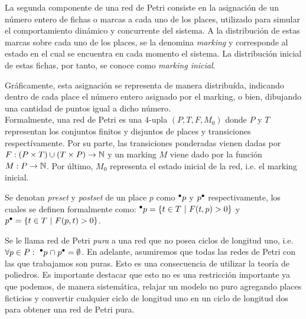 La segunda componente de una red de Petri consiste en la asignación
de un número entero de fichas o marcas a cada uno de los places, 
utilizado para simular el comportamiento dinámico y concurrente del sistema.
A la distribución de estas marcas sobre cada uno de los places, se la denomina
\textit{marking} y corresponde al estado en el cual se encuentra en cada momento el sistema.
La distribución inicial de estas fichas, por tanto, se conoce como \textit{marking inicial}.

Gráficamente, esta asignación se representa de manera distribuída, indicando dentro 
de cada place el número entero asignado por el marking, o bien, dibujando una 
cantidad de puntos igual a dicho número.
\\

Formalmente, una red de Petri es una 4-upla $(P,T,F,M_0)$ donde $P$ y $T$\footnotemark[1]
representan los conjuntos finitos y disjuntos de places y transiciones respectívamente.
Por su parte, las transiciones ponderadas vienen dadas por \mbox{$F:(P \times T) \cup (T \times P)  \to \mathbb{N}$}
y un marking $M$ viene dado por la función \mbox{$M:P \to \mathbb{N}$}.
Por último, $M_0$ representa el estado inicial de la red, i.e. el marking inicial.


Se denotan \textit{preset} y \textit{postset} de un place $p$ como $\mbox{$^\bullet p$}$ y $\mbox{$p^\bullet$}$ respectivamente,
los cuales se definen formalmente como: $\mbox{$^\bullet p$} =  \{t \in T ~|~ F(t,p) > 0 \}$
y $\mbox{$p^\bullet$} = \{t \in T ~|~ F(p,t) > 0 \}$.

Se le llama red de Petri \emph{pura} a una red que no posea ciclos de longitud uno, i.e.
$\forall p \in P:~ {\mbox{$^\bullet p$}} \mathrel{\cap} {\mbox{$p^\bullet$}} = \emptyset$.
En adelante, asumiremos que todas las redes de Petri con las que trabajamos son puras.
Esto es una consecuencia de utilizar la teoría de poliedros. Es importante destacar que esto no es una 
restricción importante ya que podemos, de manera sistemática, relajar un modelo no puro agregando
places ficticios y convertir cualquier ciclo de longitud uno en un ciclo de longitud dos para
obtener una red de Petri pura.
\\


